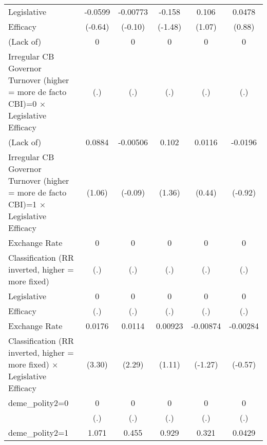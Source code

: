 {\begin{tabular}{l*{5}{c}}
\addlinespace
Legislative     &  -0.0599         & -0.00773         &   -0.158         &    0.106         &   0.0478         \\
Efficacy        &  (-0.64)         &  (-0.10)         &  (-1.48)         &   (1.07)         &   (0.88)         \\
\addlinespace
(Lack of)       &        0         &        0         &        0         &        0         &        0         \\
Irregular CB Governor Turnover (higher = more de facto CBI)=0 $\times$ Legislative Efficacy&      (.)         &      (.)         &      (.)         &      (.)         &      (.)         \\
\addlinespace
(Lack of)       &   0.0884         & -0.00506         &    0.102         &   0.0116         &  -0.0196         \\
Irregular CB Governor Turnover (higher = more de facto CBI)=1 $\times$ Legislative Efficacy&   (1.06)         &  (-0.09)         &   (1.36)         &   (0.44)         &  (-0.92)         \\
\addlinespace
Exchange Rate   &        0         &        0         &        0         &        0         &        0         \\
Classification (RR inverted, higher = more fixed)&      (.)         &      (.)         &      (.)         &      (.)         &      (.)         \\
\addlinespace
Legislative     &        0         &        0         &        0         &        0         &        0         \\
Efficacy        &      (.)         &      (.)         &      (.)         &      (.)         &      (.)         \\
\addlinespace
Exchange Rate   &   0.0176\sym{**} &   0.0114\sym{*}  &  0.00923         & -0.00874         & -0.00284         \\
Classification (RR inverted, higher = more fixed) $\times$ Legislative Efficacy&   (3.30)         &   (2.29)         &   (1.11)         &  (-1.27)         &  (-0.57)         \\
\addlinespace
deme\_polity2=0  &        0         &        0         &        0         &        0         &        0         \\
                &      (.)         &      (.)         &      (.)         &      (.)         &      (.)         \\
\addlinespace
deme\_polity2=1  &    1.071\sym{***}&    0.455\sym{**} &    0.929\sym{***}&    0.321         &   0.0429         \\

\end{tabular}}

